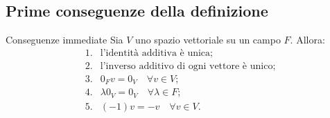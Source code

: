 \documentclass[a4paper]{article}
\begin{document}
\subsection{Prime conseguenze della definizione}

\begin{snippetproposition}{Conseguenze immediate}
    Sia \(V\) uno spazio vettoriale su un campo \(F\). Allora:
    \[
        \begin{array}{ll}
            \text{1.} & \text{l'identità additiva è unica;}\\[1mm]
            \text{2.} & \text{l'inverso additivo di ogni vettore è unico;}\\[1mm]
            \text{3.} & 0_F v=0_V \quad \forall v\in V;\\[1mm]
            \text{4.} & \lambda 0_V=0_V \quad \forall \lambda\in F;\\[1mm]
            \text{5.} & (-1)v=-v \quad \forall v\in V.
        \end{array}
    \]
\end{snippetproposition}
\end{document}
